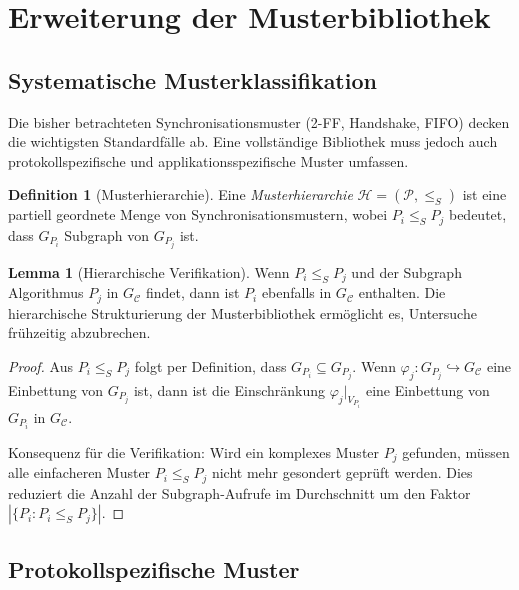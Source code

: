 ﻿\documentclass[a4paper,12pt]{article}
\theoremstyle{definition}
\newtheorem{definition}{Definition}
\newtheorem{lemma}{Lemma}
\begin{document}
	\section{Erweiterung der Musterbibliothek}
	
	\subsection{Systematische Musterklassifikation}
	
	Die bisher betrachteten Synchronisationsmuster (2-FF, Handshake, FIFO)
	decken die wichtigsten Standardf\"alle ab. Eine vollst\"andige Bibliothek
	muss jedoch auch protokollspezifische und applikationsspezifische Muster
	umfassen.
	
	\begin{definition}[Musterhierarchie]
		Eine \emph{Musterhierarchie} $\mathcal{H} = (\mathcal{P}, \leq_S)$ ist
		eine partiell geordnete Menge von Synchronisationsmustern, wobei
		$P_i \leq_S P_j$ bedeutet, dass $G_{P_i}$ Subgraph von $G_{P_j}$ ist.
	\end{definition}
	
	\begin{lemma}[Hierarchische Verifikation]
		\label{lem:hierarchie}
		Wenn $P_i \leq_S P_j$ und der Subgraph Algorithmus $P_j$ in
		$G_{\mathcal{C}}$ findet, dann ist $P_i$ ebenfalls in $G_{\mathcal{C}}$
		enthalten. Die hierarchische Strukturierung der Musterbibliothek
		erm\"oglicht es, Untersuche fr\"uhzeitig abzubrechen.
	\end{lemma}
	
	\begin{proof}
		Aus $P_i \leq_S P_j$ folgt per Definition, dass $G_{P_i} \subseteq G_{P_j}$.
		Wenn $\varphi_j: G_{P_j} \hookrightarrow G_{\mathcal{C}}$ eine Einbettung
		von $G_{P_j}$ ist, dann ist die Einschr\"ankung $\varphi_j|_{V_{P_i}}$
		eine Einbettung von $G_{P_i}$ in $G_{\mathcal{C}}$.
		
		Konsequenz f\"ur die Verifikation: Wird ein komplexes Muster $P_j$ gefunden,
		m\"ussen alle einfacheren Muster $P_i \leq_S P_j$ nicht mehr gesondert
		gepr\"uft werden. Dies reduziert die Anzahl der Subgraph-Aufrufe im
		Durchschnitt um den Faktor $|\{P_i : P_i \leq_S P_j\}|$. \qedhere
	\end{proof}
	
	\subsection{Protokollspezifische Muster}
	
\end{document}
